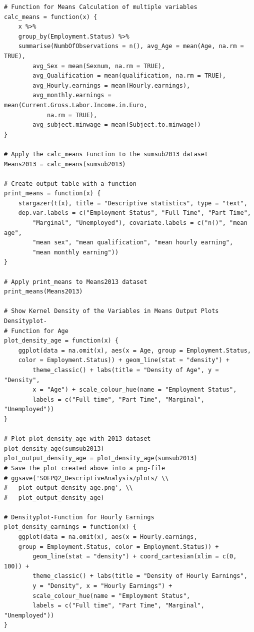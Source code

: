 \documentclass[a4paper]{article}
\begin{document}
{\begin{lstlisting}
# Function for Means Calculation of multiple variables
calc_means = function(x) {
    x %>% 
    group_by(Employment.Status) %>% 
    summarise(NumbOfObservations = n(), avg_Age = mean(Age, na.rm = TRUE),
        avg_Sex = mean(Sexnum, na.rm = TRUE), 
        avg_Qualification = mean(qualification, na.rm = TRUE),
        avg_Hourly.earnings = mean(Hourly.earnings), 
        avg_monthly.earnings = mean(Current.Gross.Labor.Income.in.Euro, 
        	na.rm = TRUE), 
        avg_subject.minwage = mean(Subject.to.minwage))
}

# Apply the calc_means Function to the sumsub2013 dataset
Means2013 = calc_means(sumsub2013)

# Create output table with a function
print_means = function(x) {
    stargazer(t(x), title = "Descriptive statistics", type = "text", 
    dep.var.labels = c("Employment Status", "Full Time", "Part Time", 
    	"Marginal", "Unemployed"), covariate.labels = c("n()", "mean age", 
        "mean sex", "mean qualification", "mean hourly earning", 
        "mean monthly earning"))
}

# Apply print_means to Means2013 dataset
print_means(Means2013)

# Show Kernel Density of the Variables in Means Output Plots Densityplot-
# Function for Age
plot_density_age = function(x) {
    ggplot(data = na.omit(x), aes(x = Age, group = Employment.Status, 
    color = Employment.Status)) + geom_line(stat = "density") + 
        theme_classic() + labs(title = "Density of Age", y = "Density", 
        x = "Age") + scale_colour_hue(name = "Employment Status", 
        labels = c("Full time", "Part Time", "Marginal", "Unemployed"))
}

# Plot plot_density_age with 2013 dataset
plot_density_age(sumsub2013)
plot_output_density_age = plot_density_age(sumsub2013)
# Save the plot created above into a png-file 
# ggsave('SOEPQ2_DescriptiveAnalysis/plots/ \\ 
# 	plot_output_density_age.png', \\
#	plot_output_density_age)

# Densityplot-Function for Hourly Earnings
plot_density_earnings = function(x) {
    ggplot(data = na.omit(x), aes(x = Hourly.earnings, 
    group = Employment.Status, color = Employment.Status)) + 
        geom_line(stat = "density") + coord_cartesian(xlim = c(0, 100)) + 
        theme_classic() + labs(title = "Density of Hourly Earnings", 
        y = "Density", x = "Hourly Earnings") + 
        scale_colour_hue(name = "Employment Status", 
        labels = c("Full time", "Part Time", "Marginal", "Unemployed"))
}


\end{lstlisting}}
\end{document}
